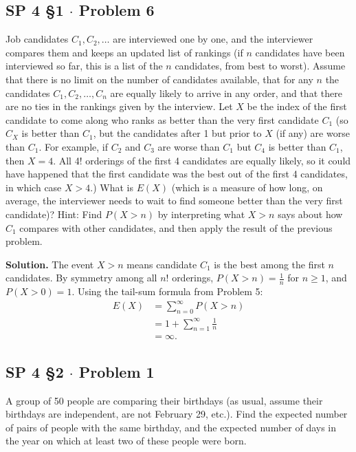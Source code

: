 \documentclass[11pt,a4paper]{article}
\begin{document}
\subsection{SP 4 \S1 $\cdot$ Problem 6}
\begin{tcolorbox}[title={SP 4 \S1 $\cdot$ Problem 6}]
Job candidates $C_1, C_2, \dots$ are interviewed one by one, and the interviewer compares them and keeps an updated list of rankings (if $n$ candidates have been interviewed so far, this is a list of the $n$ candidates, from best to worst).
Assume that there is no limit on the number of candidates available, that for any $n$ the candidates $C_1, C_2, \dots, C_n$ are equally likely to arrive in any order, and that there are no ties in the rankings given by the interview.
Let $X$ be the index of the first candidate to come along who ranks as better than the very first candidate $C_1$ (so $C_X$ is better than $C_1$, but the candidates after 1 but prior to $X$ (if any) are worse than $C_1$. For example, if $C_2$ and $C_3$ are worse than $C_1$ but $C_4$ is better than $C_1$, then $X = 4$. All 4! orderings of the first 4 candidates are equally likely, so it could have happened that the first candidate was the best out of the first 4 candidates, in which case $X > 4$.)
What is $E(X)$ (which is a measure of how long, on average, the interviewer needs to wait to find someone better than the very first candidate)? Hint: Find $P(X > n)$ by interpreting what $X > n$ says about how $C_1$ compares with other candidates, and then apply the result of the previous problem.
\end{tcolorbox}

\noindent \textbf{Solution.} The event $X > n$ means candidate $C_1$ is the best among the first $n$ candidates. By symmetry among all $n!$ orderings, $P(X > n) = \frac{1}{n}$ for $n \ge 1$, and $P(X > 0) = 1$. Using the tail-sum formula from Problem 5:
\begin{align*}
E(X) &= \sum_{n=0}^{\infty} P(X > n) \\
&= 1 + \sum_{n=1}^{\infty} \frac{1}{n} \\
&= \infty.
\end{align*}

\vspace{10pt}
\subsection{SP 4 \S2 $\cdot$ Problem 1}
\begin{tcolorbox}[title={SP 4 \S2 $\cdot$ Problem 1}]
A group of 50 people are comparing their birthdays (as usual, assume their birthdays are independent, are not February 29, etc.). Find the expected number of pairs of people with the same birthday, and the expected number of days in the year on which at least two of these people were born.
\end{tcolorbox}
\end{document}
